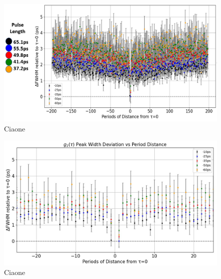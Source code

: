 \begin{figure}[hbtp]
\centering
\includegraphics[width=1\textwidth]{DeltaFWHMvsPeriods.jpg}
\caption{Ciaone}
\label{DeltaFWHMvsPERIOD_General}
\end{figure}

\begin{figure}[hbtp]
\centering
\includegraphics[width=1\textwidth]{DeltaFWHMvsPeriods_ZOOM.jpg}
\caption{Ciaone}
\label{DeltaFWHMvsPERIOD_ZOOM}
\end{figure}
